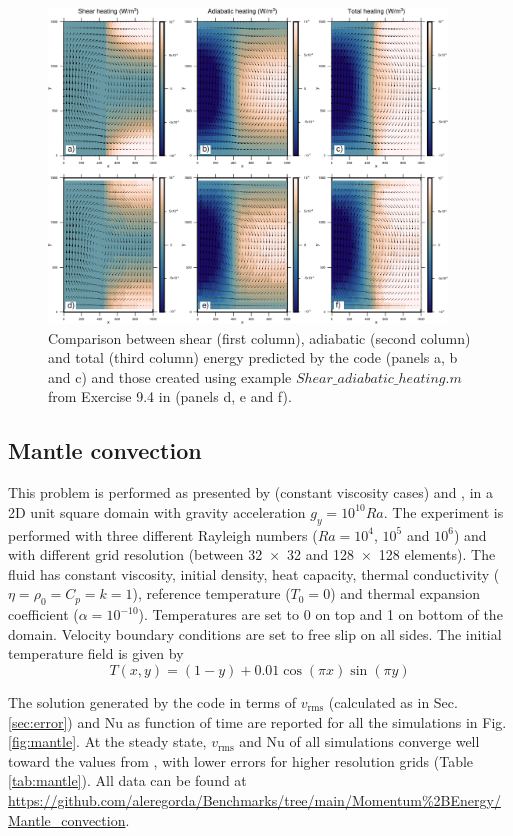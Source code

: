\documentclass[hidelinks,10pt,a4paper]{article}
\begin{document}
\begin{figure}
\centering
\noindent\includegraphics[width=400px]{./Figures/Energy.pdf}
\caption{Comparison between shear (first column), adiabatic (second column) and total (third column) energy predicted by the code (panels a, b and c) and those
created using example ${Shear\_adiabatic\_heating.m}$ from Exercise 9.4 in \citet{Gerya2010b} (panels d, e and f).}
\label{fig:energy}
\end{figure}

\subsection{Mantle convection}\label{sec:mantle}
This problem is performed as presented by \citet{Blankenbach1989} (constant viscosity cases) and \citet{Thieulot2014}, in a 2D unit square domain with gravity
acceleration $g_y=10^{10}Ra$. The experiment is performed with three different Rayleigh numbers ($Ra=10^4$, $10^5$ and $10^6$) and with different grid
resolution (between \num{32x32} and \num{128x128} elements). The fluid has constant viscosity, initial density, heat capacity, thermal conductivity
($\eta= \rho_0= C_p = k=1$), reference temperature ($T_0=0$) and thermal expansion coefficient ($\alpha=10^{-10}$). Temperatures are set to 0 on top and 1 on
bottom of the domain. Velocity boundary conditions are set to free slip on all sides. The initial temperature field is given by
\[T(x,y)=(1-y)+0.01 \cos (\pi x) \sin (\pi y)\]

The solution generated by the code in terms of $v_{\textrm{rms}}$ (calculated as in Sec. \ref{sec:error}) and Nu as function of time are reported for all the
simulations in Fig. \ref{fig:mantle}. At the steady state, $v_{\textrm{rms}}$ and Nu of all simulations converge well toward the values from \citet{Blankenbach1989},
with lower errors for higher resolution grids (Table \ref{tab:mantle}). All data can be found at 
\url{https://github.com/aleregorda/Benchmarks/tree/main/Momentum%2BEnergy/Mantle_convection}.
\end{document}
